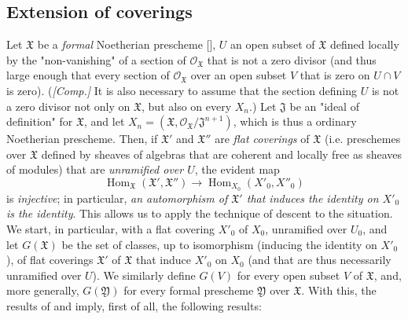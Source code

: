 \subsection{Extension of coverings}\label{fga3.ii-c.5}

Let $\mathfrak{X}$ be a \emph{formal} Noetherian prescheme [], $U$ an open subset of $\mathfrak{X}$ defined locally by the "non-vanishing" of a section of $\mathcal{O}_\mathfrak{X}$ that is not a zero divisor (and thus large enough that every section of $\mathcal{O}_\mathfrak{X}$ over an open subset $V$ that is zero on $U\cap V$ is zero).
(\emph{[Comp.]} It is also necessary to assume that the section defining $U$ is not a zero divisor not only on $\mathfrak{X}$, but also on every $X_n$.)
Let $\mathfrak{J}$ be an "ideal of definition" for $\mathfrak{X}$, and let $X_n=(\mathfrak{X},\mathcal{O}_\mathfrak{X}/\mathfrak{J}^{n+1})$, which is thus a ordinary Noetherian prescheme.
Then, if $\mathfrak{X}'$ and $\mathfrak{X}''$ are \emph{flat coverings} of $\mathfrak{X}$ (i.e. preschemes over $\mathfrak{X}$ defined by sheaves of algebras that are coherent and locally free as sheaves of modules) that are \emph{unramified over $U$}, the evident map
\[
    \operatorname{Hom}_\mathfrak{X}(\mathfrak{X}',\mathfrak{X}'')
    \to \operatorname{Hom}_{X_0}(X'_0,X''_0)
\]
is \emph{injective};
in particular, \emph{an automorphism of $\mathfrak{X}'$ that induces the identity on $X'_0$ is the identity}.
This allows us to apply the technique of descent to the situation.
We start, in particular, with a flat covering $X'_0$ of $X_0$, unramified over $U_0$, and let $G(\mathfrak{X})$ be the set of classes, up to isomorphism (inducing the identity on $X'_0$), of flat coverings $\mathfrak{X}'$ of $\mathfrak{X}$ that induce $X'_0$ on $X_0$ (and that are thus necessarily unramified over $U$).
We similarly define $G(V)$ for every open subset $V$ of $\mathfrak{X}$, and, more generally, $G(\mathfrak{Y})$ for every formal prescheme $\mathfrak{Y}$ over $\mathfrak{X}$.
With this, the results of  and  imply, first of all, the following results:


